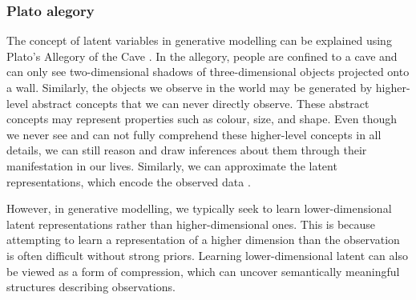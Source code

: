 \subsubsection*{Plato alegory}
The concept of latent variables in generative modelling can be explained using Plato's Allegory of the Cave \cite{plato-alegory}. 
In the allegory, people are confined to a cave and can only see two-dimensional shadows of three-dimensional objects projected onto a wall. 
Similarly, the objects we observe in the world may be generated by higher-level abstract concepts that we can never directly observe. 
These abstract concepts may represent properties such as colour, size, and shape. Even though we never see and can not fully comprehend these 
higher-level concepts in all details, we can still reason and draw inferences about them through their manifestation in our lives. 
Similarly, we can approximate the latent representations, which encode the observed data \cite{diffusion-models-blog-2018}.  

However, in generative modelling, we typically seek to learn lower-dimensional latent representations rather than higher-dimensional ones. 
This is because attempting to learn a representation of a higher dimension than the observation is often difficult without strong priors. 
Learning lower-dimensional latent can also be viewed as a form of compression, which can uncover semantically meaningful structures describing
observations.

